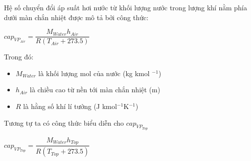 \documentclass[a4paper]{article}
\begin{document}
    
    
    Hệ số chuyển đổi áp suất hơi nước từ khối lượng nước trong lượng khí nằm phía dưới màn chắn nhiệt được mô tả bởi công thức:
    \begin{center}
        $cap_{VP_{Air}} = \dfrac{M_{Water}h_{Air}}{R(T_{Air} + 273.5)}$
    \end{center}
    Trong đó:
    \begin{itemize}
        \item $M_{Water}$ là khối lượng mol của nước (kg kmol $^{-1}$)
        \item $h_{Air}$ là chiều cao từ nền tới màn chắn nhiệt (m)
        \item $R$ là hằng số khí lí tưởng (J kmol$^{-1}$K$^{-1}$) 
    \end{itemize}
    Tương tự ta có công thức biểu diễn cho $cap_{VP_{Top}}$
    \begin{center}
        $cap_{VP_{Top}} = \dfrac{M_{Water}h_{Top}}{R(T_{Top} + 273.5)}$
    \end{center}
    
    \vspace{5mm}
    
\end{document}
